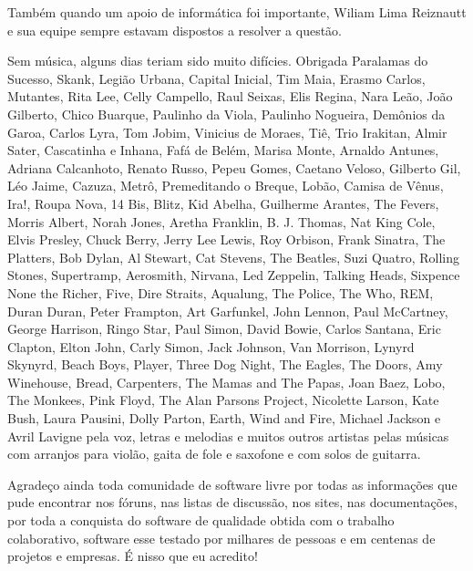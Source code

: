 Também quando um apoio de informática foi importante, Wiliam Lima Reiznautt e sua equipe sempre estavam dispostos a resolver a questão.

Sem música, alguns dias teriam sido muito difícies. Obrigada Paralamas do Sucesso, Skank, Legião Urbana, Capital Inicial, Tim Maia, Erasmo Carlos, Mutantes, Rita Lee, Celly Campello, Raul Seixas, Elis Regina, Nara Leão, João Gilberto, Chico Buarque, Paulinho da Viola, Paulinho Nogueira, Demônios da Garoa, Carlos Lyra, Tom Jobim, Vinicius de Moraes, Tiê, Trio Irakitan, Almir Sater, Cascatinha e Inhana, Fafá de Belém, Marisa Monte, Arnaldo Antunes,  Adriana Calcanhoto, Renato Russo, Pepeu Gomes, Caetano Veloso, Gilberto Gil, Léo Jaime, Cazuza, Metrô, Premeditando o Breque, Lobão, Camisa de Vênus, Ira!, Roupa Nova, 14 Bis, Blitz, Kid Abelha, Guilherme Arantes, The Fevers, Morris Albert, Norah Jones, Aretha Franklin, B. J. Thomas, Nat King Cole, Elvis Presley, Chuck Berry, Jerry Lee Lewis, Roy Orbison, Frank Sinatra, The Platters, Bob Dylan, Al Stewart, Cat Stevens, The Beatles, Suzi Quatro, Rolling Stones, Supertramp, Aerosmith, Nirvana, Led Zeppelin, Talking Heads, Sixpence None the Richer, Five, Dire Straits, Aqualung, The Police, The Who, REM, Duran Duran, Peter Frampton, Art Garfunkel, John Lennon, Paul McCartney, George Harrison, Ringo Star, Paul Simon, David Bowie, Carlos Santana, Eric Clapton, Elton John, Carly Simon, Jack Johnson, Van Morrison, Lynyrd Skynyrd, Beach Boys, Player, Three Dog Night, The Eagles, The Doors, Amy Winehouse, Bread, Carpenters, The Mamas and The Papas, Joan Baez, Lobo, The Monkees, Pink Floyd, The Alan Parsons Project, Nicolette Larson, Kate Bush, Laura Pausini, Dolly Parton, Earth, Wind and Fire, Michael Jackson e Avril Lavigne pela voz, letras e melodias e muitos outros artistas pelas músicas com arranjos para violão, gaita de fole e saxofone e com solos de guitarra.

Agradeço ainda toda comunidade de software livre por todas as informações que pude encontrar nos fóruns, nas listas de discussão, nos sites, nas documentações, por toda a conquista do software de qualidade obtida com o trabalho colaborativo, software esse testado por milhares de pessoas e em centenas de projetos e empresas. É nisso que eu acredito!



